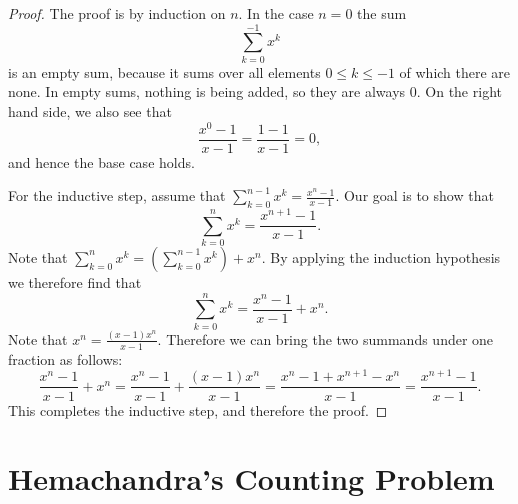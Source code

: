 \begin{proof}
  The proof is by induction on $n$. In the case $n=0$ the sum
  \begin{equation*}
    \sum_{k=0}^{-1}x^k
  \end{equation*}
  is an empty sum, because it sums over all elements $0\leq k \leq -1$ of which there are none. In empty sums, nothing is being added, so they are always $0$. On the right hand side, we also see that
  \begin{equation*}
    \frac{x^0-1}{x-1}=\frac{1-1}{x-1}=0,
  \end{equation*}
  and hence the base case holds.

  For the inductive step, assume that $\sum_{k=0}^{n-1}x^k=\frac{x^n-1}{x-1}$. Our goal is to show that
  \begin{equation*}
    \sum_{k=0}^{n}x^k=\frac{x^{n+1}-1}{x-1}.
  \end{equation*}
  Note that $\sum_{k=0}^{n}x^k=(\sum_{k=0}^{n-1}x^k)+x^n$. By applying the induction hypothesis we therefore find that
  \begin{equation*}
    \sum_{k=0}^{n}x^k=\frac{x^n-1}{x-1}+x^n.
  \end{equation*}
  Note that $x^n=\frac{(x-1)x^n}{x-1}$. Therefore we can bring the two summands under one fraction as follows:
  \begin{equation*}
    \frac{x^n-1}{x-1}+x^n=\frac{x^n-1}{x-1}+\frac{(x-1)x^n}{x-1}=\frac{x^n-1+x^{n+1}-x^n}{x-1}=\frac{x^{n+1}-1}{x-1}.
  \end{equation*}
  This completes the inductive step, and therefore the proof.
\end{proof}

\section{Hemachandra's Counting Problem}
\label{section:hemachandra}


